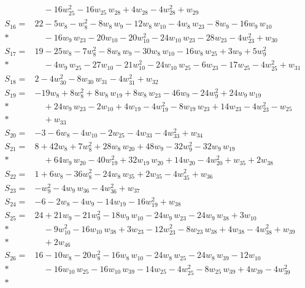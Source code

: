 \begin{align*}
&\quad  - 16w_{25}^{2} - 16w_{25}\,w_{28} + 4w_{28} - 4w_{28}^{2} + w_{29} \\[2pt]
S_{16}={}& 22 - 5w_{8} - w_{8}^{2} - 8w_{8}\,w_{9} - 12w_{8}\,w_{10} - 4w_{8}\,w_{23} - 8w_{9} - 16w_{9}\,w_{10} \\*
&\quad  - 16w_{9}\,w_{23} - 20w_{10} - 20w_{10}^{2} - 24w_{10}\,w_{23} - 28w_{23} - 4w_{23}^{2} + w_{30} \\[2pt]
S_{17}={}& 19 - 25w_{8} - 7w_{8}^{2} - 8w_{8}\,w_{9} - 30w_{8}\,w_{10} - 16w_{8}\,w_{25} + 3w_{9} + 5w_{9}^{2} \\*
&\quad  - 4w_{9}\,w_{25} - 27w_{10} - 21w_{10}^{2} - 24w_{10}\,w_{25} - 6w_{23} - 17w_{25} - 4w_{25}^{2} + w_{31} \\[2pt]
S_{18}={}& 2 - 4w_{30}^{2} - 8w_{30}\,w_{31} - 4w_{31}^{2} + w_{32} \\[2pt]
S_{19}={}& -19w_{8} + 8w_{8}^{2} + 8w_{8}\,w_{19} + 8w_{8}\,w_{23} - 46w_{9} - 24w_{9}^{2} + 24w_{9}\,w_{19} \\*
&\quad  + 24w_{9}\,w_{23} - 2w_{10} + 4w_{19} - 4w_{19}^{2} - 8w_{19}\,w_{23} + 14w_{23} - 4w_{23}^{2} - w_{25} \\*
&\quad  + w_{33} \\[2pt]
S_{20}={}& -3 - 6w_{8} - 4w_{10} - 2w_{25} - 4w_{33} - 4w_{33}^{2} + w_{34} \\[2pt]
S_{21}={}& 8 + 42w_{8} + 7w_{8}^{2} + 28w_{8}\,w_{20} + 48w_{9} - 32w_{9}^{2} - 32w_{9}\,w_{19} \\*
&\quad  + 64w_{9}\,w_{20} - 40w_{19}^{2} + 32w_{19}\,w_{20} + 14w_{20} - 4w_{20}^{2} + w_{35} + 2w_{38} \\[2pt]
S_{22}={}& 1 + 6w_{8} - 36w_{8}^{2} - 24w_{8}\,w_{35} + 2w_{35} - 4w_{35}^{2} + w_{36} \\[2pt]
S_{23}={}& -w_{9}^{2} - 4w_{9}\,w_{36} - 4w_{36}^{2} + w_{37} \\[2pt]
S_{24}={}& -6 - 2w_{8} - 4w_{9} - 14w_{19} - 16w_{19}^{2} + w_{38} \\[2pt]
S_{25}={}& 24 + 21w_{9} - 21w_{9}^{2} - 18w_{9}\,w_{10} - 24w_{9}\,w_{23} - 24w_{9}\,w_{38} + 3w_{10} \\*
&\quad  - 9w_{10}^{2} - 16w_{10}\,w_{38} + 3w_{23} - 12w_{23}^{2} - 8w_{23}\,w_{38} + 4w_{38} - 4w_{38}^{2} + w_{39} \\*
&\quad  + 2w_{46} \\[2pt]
S_{26}={}& 16 - 10w_{8} - 20w_{8}^{2} - 16w_{8}\,w_{10} - 24w_{8}\,w_{25} - 24w_{8}\,w_{39} - 12w_{10} \\*
&\quad  - 16w_{10}\,w_{25} - 16w_{10}\,w_{39} - 14w_{25} - 4w_{25}^{2} - 8w_{25}\,w_{39} + 4w_{39} - 4w_{39}^{2} \\*

\end{align*}
